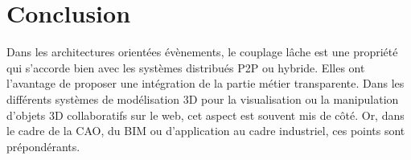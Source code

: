 \section{Conclusion}

Dans les architectures orientées évènements, le couplage lâche est une propriété 
qui s'accorde bien avec les systèmes distribués \gls{P2P} ou hybride. Elles ont 
l'avantage de 
proposer une intégration de la partie métier transparente. Dans les différents 
systèmes de modélisation 3D pour la visualisation ou la manipulation d'objets 3D 
collaboratifs sur le web, cet aspect est souvent mis de côté. Or, dans le cadre de 
la \gls{CAO}, du \gls{BIM} ou d'application au cadre industriel, ces points sont 
prépondérants. 



